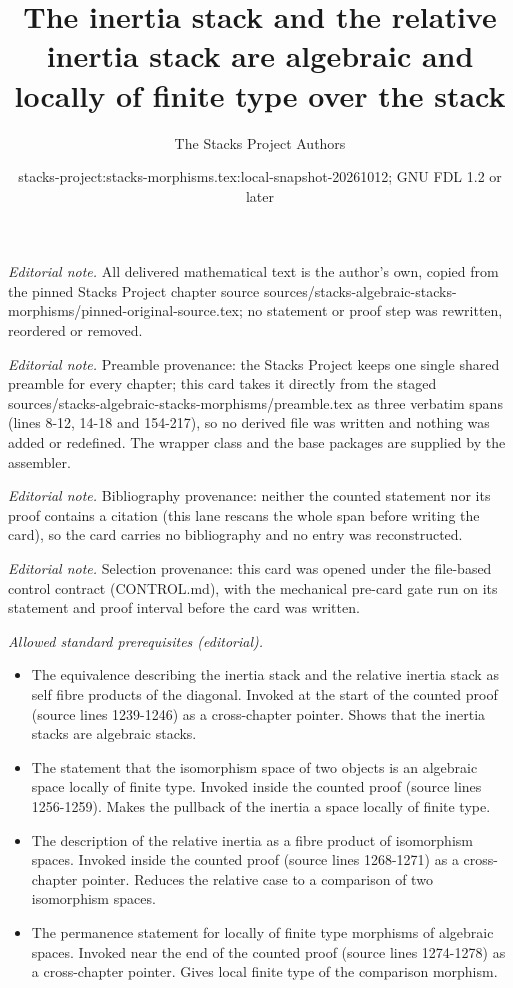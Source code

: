 \documentclass[10pt,a4paper]{amsart}
\title{The inertia stack and the relative inertia stack are algebraic and locally of finite type over the stack}
\author{The Stacks Project Authors}
\date{stacks-project:stacks-morphisms.tex:local-snapshot-20261012; GNU FDL 1.2 or later}
\theoremstyle{plain}
\theoremstyle{definition}
\theoremstyle{remark}
\numberwithin{equation}{subsection}
\begin{document}
\maketitle
\noindent\textit{Editorial note.} All delivered mathematical text is the author's own, copied from the pinned Stacks Project chapter source sources/stacks-algebraic-stacks-morphisms/pinned-original-source.tex; no statement or proof step was rewritten, reordered or removed.\par\medskip
\noindent\textit{Editorial note.} Preamble provenance: the Stacks Project keeps one single shared preamble for every chapter; this card takes it directly from the staged sources/stacks-algebraic-stacks-morphisms/preamble.tex as three verbatim spans (lines 8-12, 14-18 and 154-217), so no derived file was written and nothing was added or redefined. The wrapper class and the base packages are supplied by the assembler.\par\medskip
\noindent\textit{Editorial note.} Bibliography provenance: neither the counted statement nor its proof contains a citation (this lane rescans the whole span before writing the card), so the card carries no bibliography and no entry was reconstructed.\par\medskip
\noindent\textit{Editorial note.} Selection provenance: this card was opened under the file-based control contract (CONTROL.md), with the mechanical pre-card gate run on its statement and proof interval before the card was written.\par\medskip
\noindent\textit{Allowed standard prerequisites (editorial).}\begin{itemize}
\item The equivalence describing the inertia stack and the relative inertia stack as self fibre products of the diagonal. Invoked at the start of the counted proof (source lines 1239-1246) as a cross-chapter pointer. Shows that the inertia stacks are algebraic stacks.
\item The statement that the isomorphism space of two objects is an algebraic space locally of finite type. Invoked inside the counted proof (source lines 1256-1259). Makes the pullback of the inertia a space locally of finite type.
\item The description of the relative inertia as a fibre product of isomorphism spaces. Invoked inside the counted proof (source lines 1268-1271) as a cross-chapter pointer. Reduces the relative case to a comparison of two isomorphism spaces.
\item The permanence statement for locally of finite type morphisms of algebraic spaces. Invoked near the end of the counted proof (source lines 1274-1278) as a cross-chapter pointer. Gives local finite type of the comparison morphism.
\end{itemize}\medskip
\end{document}
